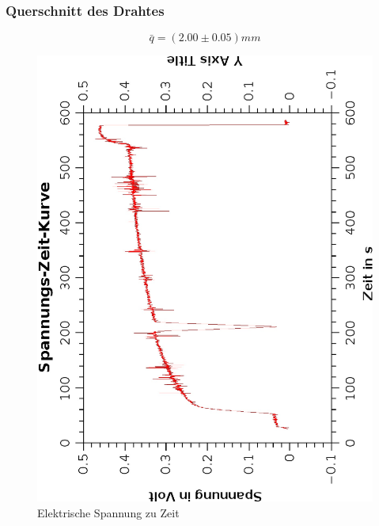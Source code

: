 \documentclass{article}
\begin{document}
\subsubsection*{Querschnitt des Drahtes}
$$\bar{q}=(2.00 \pm 0.05)mm$$ 
\begin{center}
\begin{figure}
\caption{Elektrische Spannung zu Zeit}
\includegraphics[scale=0.8, angle=-90]{voltzeitkurve.eps}
\end{figure}
\end{center}
\end{document}
